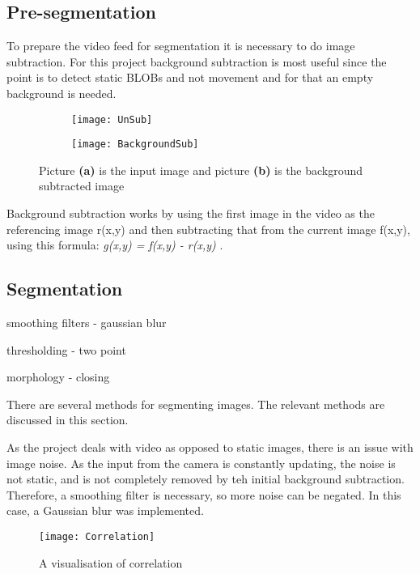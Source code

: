 \subsection{Pre-segmentation}
To prepare the video feed for segmentation it is necessary to do image subtraction. For this project background subtraction is most useful since the point is to detect static BLOBs and not movement and for that an empty background is needed. 

\begin{figure}
	\centering
	\begin{subfigure}[b]{0.3\textwidth}
	\texttt{[image: UnSub]}
		\caption{\label{Fig:UnSub}}
	\end{subfigure}
	\begin{subfigure}[b]{0.3\textwidth}
	\texttt{[image: BackgroundSub]}
		\caption{\label{Fig:BackgroundSub}}
	\end{subfigure}
	\caption{Picture \textbf{(a)} is the input image and picture \textbf{(b)} is the background subtracted image\label{Fig:Subtract}}
\end{figure}

Background subtraction works by using the first image in the video as the referencing image r(x,y) and then subtracting that from the current image f(x,y), using this formula: \textit{g(x,y) = f(x,y) - r(x,y)} \citep{moeslund_introduction_2012}. 

\subsection{Segmentation}
smoothing filters
- gaussian blur

thresholding - two point

morphology - closing

There are several methods for segmenting images. The relevant methods are discussed in this section. 

As the project deals with video as opposed to static images, there is an issue with image noise. As the input from the camera is constantly updating, the noise is not static, and is not completely removed by teh initial background subtraction. Therefore, a smoothing filter is necessary, so more noise can be negated. In this case, a Gaussian blur was implemented.

\begin{figure}[h!]
\centering \texttt{[image: Correlation]}
\caption{A visualisation of correlation \label{Fig:Correlation}\citep{moeslund_introduction_2012}}
\end{figure}

